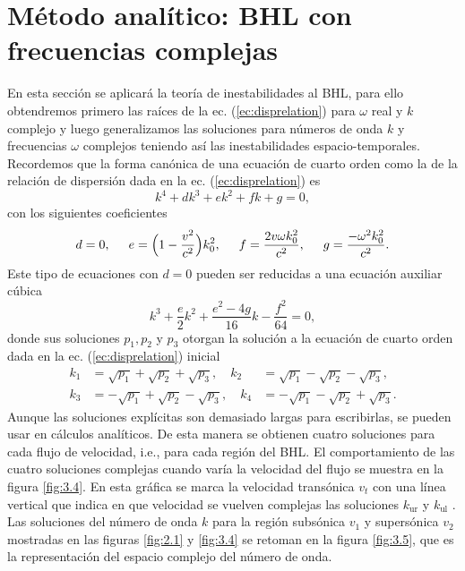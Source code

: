 \section{M\'{e}todo anal\'{i}tico: BHL con frecuencias complejas}\label{sec:compleja}
En esta secci\'{o}n se aplicar\'{a} la teoría de inestabilidades al BHL, para ello obtendremos primero las ra\'ices de la ec. (\ref{ec:disprelation}) para $\omega$ real y $k$ complejo y luego generalizamos las soluciones para números de onda $k$ y frecuencias $\omega$ complejos teniendo as\'{i} las inestabilidades espacio-temporales. Recordemos que la forma can\'{o}nica de una ecuaci\'{o}n de cuarto orden como la de la relaci\'{o}n de dispersi\'{o}n dada en la ec. (\ref{ec:disprelation}) es
\begin{equation}
k^4+dk^3+ek^2+fk+g=0,
\end{equation}
con los siguientes coeficientes
\begin{align}
d=0, \hspace{0.5cm} e=\Bigl(1-\frac{v^2}{c^2}\Bigr)k_0^2, \hspace{0.5cm} f=\frac{2v\omega k_0^2}{c^2}, \hspace{0.5cm} g=\frac{-\omega^2 k_0^2}{c^2}.
\end{align}
Este tipo de ecuaciones con $d=0$ pueden ser reducidas a una ecuaci\'{o}n auxiliar  c\'{u}bica
\begin{equation}
k^3+\frac{e}{2}k^2+\frac{e^2-4g}{16}k-\frac{f^2}{64}=0,
\end{equation}
donde sus soluciones $p_1,p_2$ y $p_3$ otorgan la soluci\'{o}n a la ecuaci\'{o}n de cuarto orden dada en la ec. (\ref{ec:disprelation}) inicial
\begin{align}
k_1&=\sqrt{p_1}+\sqrt{p_2}+\sqrt{p_3}, \quad k_2&=\sqrt{p_1}-\sqrt{p_2}-\sqrt{p_3},\\
k_3&=-\sqrt{p_1}+\sqrt{p_2}-\sqrt{p_3}, \quad k_4&=-\sqrt{p_1}-\sqrt{p_2}+\sqrt{p_3}.
\end{align}
 Aunque las soluciones explícitas son demasiado largas para escribirlas, se pueden usar en cálculos analíticos. De esta manera se obtienen cuatro soluciones para cada flujo de velocidad, i.e., para cada regi\'{o}n del BHL. El comportamiento de las cuatro soluciones complejas cuando var\'{i}a la velocidad del flujo se muestra en la figura \ref{fig:3.4}. En esta gr\'{a}fica se marca la velocidad trans\'{o}nica $v_t$ con una l\'{i}nea vertical que indica en que velocidad se vuelven complejas las soluciones $k_{\text{ur}}$ y $k_{\text{ul}}$ . Las soluciones del n\'{u}mero de onda $k$ para la regi\'{o}n subsónica $v_1$ y supersónica $v_2$ mostradas en las figuras \ref{fig:2.1} y \ref{fig:3.4} se retoman en la figura \ref{fig:3.5}, que es la representaci\'{o}n del espacio complejo del n\'{u}mero de onda.\\

